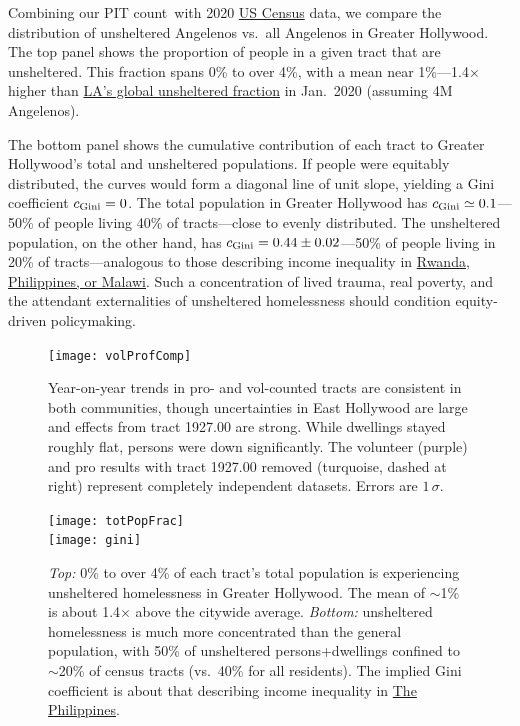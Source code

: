 \documentclass[11pt,twocolumn]{article}
\def\Count{count}
\begin{document}
Combining our PIT \Count\ with 2020 \href{https://geomap.ffiec.gov/FFIECGeocMap/GeocodeMap1.aspx}
{US Census} data, we compare the distribution of unsheltered Angelenos vs.\ all Angelenos in Greater
Hollywood. The top panel shows the proportion of people in a given tract that are unsheltered. This fraction 
spans 0\% to over 4\%, with a mean near 1\%---1.4$\times$ higher than 
\href{https://www.lahsa.org/documents?id=4680-2020-greater-los-angeles-homeless-count-city-of-los-angeles}
{LA's global unsheltered fraction} in Jan.~2020 (assuming 4M Angelenos).

The bottom panel shows the cumulative contribution of each tract to Greater Hollywood's
total and unsheltered populations. If people were equitably distributed, the curves would 
form a diagonal line of unit slope, yielding a Gini coefficient $c_{\rm Gini}=0$. 
The total population in Greater Hollywood has $c_{\rm Gini}\simeq0.1$---50\% of people 
living 40\% of tracts---close to evenly distributed. The unsheltered population, 
on the other hand, has $c_{\rm Gini}=0.44\pm0.02$---50\% of people living in 20\% of 
tracts---analogous to those describing income inequality in 
\href{https://en.wikipedia.org/wiki/List_of_countries_by_income_equality#UN,_World_Bank_and_CIA_list_\%E2\%80\%93_income_ratios_and_Gini_indices}{Rwanda, Philippines, or Malawi}. Such a concentration 
of lived trauma, real poverty, and the attendant externalities of unsheltered homelessness 
should condition equity-driven policymaking.

\begin{figure}[t]
	\centering
	\texttt{[image: volProfComp]}
	\caption{Year-on-year trends in pro- and vol-counted tracts are consistent in both 
			communities, though uncertainties in East Hollywood are large and
			effects from tract 1927.00 are strong. While dwellings stayed roughly flat, 
			persons were down significantly. The volunteer (purple) and pro results 
			with tract 1927.00 removed (turquoise, dashed at right) represent
			completely independent datasets. Errors are $1\,\sigma$.}
	\label{fig:proVolComp}
\end{figure}

\begin{figure}[t!]
	\centering
	\texttt{[image: totPopFrac]}\\
	\texttt{[image: gini]}
	\caption{{\it Top:} 0\% to over 4\% of each tract's total population is experiencing unsheltered
			homelessness in Greater Hollywood. The mean of $\sim$1\% is about 1.4$\times$ above
			the citywide average. {\it Bottom:} unsheltered homelessness is much more concentrated 
			than the general population, with 50\% of unsheltered persons+dwellings confined to 
			$\sim$20\% of census tracts (vs.\ 40\%	for all residents). The implied Gini coefficient
			is about that describing income inequality in 
			\href{https://en.wikipedia.org/wiki/List_of_countries_by_income_equality}
			{The Philippines}.}
	\label{fig:gini}
\end{figure}
\end{document}
